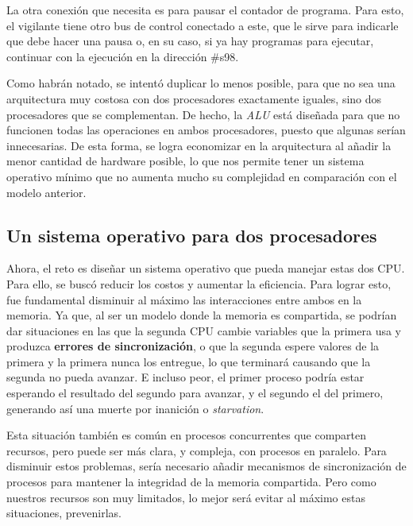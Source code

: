 \documentclass[letterpaper,12pt,oneside]{book}
\begin{document}
		La otra conexión que necesita es para pausar el contador
		de programa. Para esto, el vigilante tiene otro bus de control conectado a este, que le sirve para indicarle que debe hacer una pausa o, en su 
		caso, si
		ya hay programas para ejecutar, continuar con la ejecución en la dirección \#s98.
	 	 	
		
		
		Como habrán notado, se intentó duplicar lo menos posible, para que no sea una arquitectura muy costosa con dos procesadores 
		exactamente iguales,
		sino dos procesadores que se complementan. De hecho, la \textit{ALU} está diseñada para que no funcionen todas las operaciones en ambos 
		procesadores,
		puesto que algunas serían innecesarias. De esta forma, se logra economizar en la arquitectura al añadir la menor cantidad de hardware posible, 
		lo  que nos permite tener un sistema operativo mínimo que no aumenta mucho su complejidad en comparación con el modelo anterior.
	 	
	 	\clearpage
	 	
	 	\subsection{Un sistema operativo para dos procesadores}
	 		
	 		Ahora, el reto es diseñar un sistema operativo que pueda manejar estas dos CPU. Para ello, se buscó reducir los costos
	 		y aumentar la eficiencia. Para lograr esto, fue fundamental disminuir al máximo las interacciones entre ambos en la memoria. Ya que, al
	 		ser un modelo donde la memoria es compartida,
	 		se podrían dar situaciones en las que la segunda CPU cambie variables que la primera usa y produzca 
	 		\textbf{errores de sincronización},
	 		o que la segunda espere valores de la primera y la primera nunca los entregue, lo que terminará causando que la segunda no pueda avanzar. E 
	 		incluso
	 		peor, el primer proceso podría estar esperando el resultado del segundo para avanzar, y el segundo el del primero, generando así
	 		una muerte por inanición o \textit{starvation}. 
    
            Esta situación también es común en procesos concurrentes que comparten recursos, pero
	 		puede ser más clara, y compleja, con procesos en paralelo. Para disminuir estos problemas, sería necesario añadir mecanismos de 
	 		sincronización de procesos para
	 		mantener la integridad de la memoria compartida. Pero como nuestros recursos son muy limitados, lo mejor será evitar al máximo estas 
	 		situaciones, prevenirlas.
	 		
\end{document}
